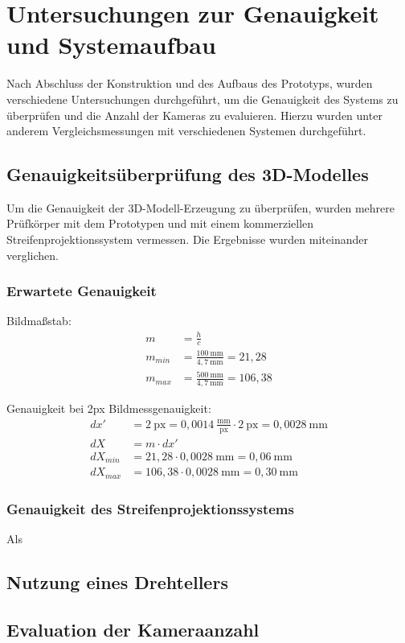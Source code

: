 \documentclass[./00PhotoBox.tex]{subfiles}
\begin{document}
\chapter{Untersuchungen zur Genauigkeit und Systemaufbau}
Nach Abschluss der Konstruktion und des Aufbaus des Prototyps, wurden verschiedene Untersuchungen durchgeführt, um die Genauigkeit des Systems zu überprüfen und die Anzahl der Kameras zu evaluieren. Hierzu wurden unter anderem Vergleichsmessungen mit verschiedenen Systemen durchgeführt.

\section{Genauigkeitsüberprüfung des 3D-Modelles}
Um die Genauigkeit der 3D-Modell-Erzeugung zu überprüfen, wurden mehrere Prüfkörper mit dem Prototypen und mit einem kommerziellen Streifenprojektionssystem vermessen. Die Ergebnisse wurden miteinander verglichen.

\subsection{Erwartete Genauigkeit}

Bildmaßstab:
\begin{align}
    m       & = \frac{h}{c}                                  \\
    m_{min} & = \frac{100~\text{mm}}{4,7~\text{mm}} = 21,28  \\
    m_{max} & = \frac{500~\text{mm}}{4,7~\text{mm}} = 106,38
\end{align}

Genauigkeit bei 2px Bildmessgenauigkeit:
\begin{align}
    dx'      & = 2~\text{px} = 0,0014~\frac{\text{mm}}{\text{px}} \cdot 2~\text{px} = 0,0028~\text{mm} \\
    dX       & = m \cdot dx'                                                                           \\
    dX_{min} & = 21,28 \cdot 0,0028~\text{mm} = 0,06~\text{mm}                                         \\
    dX_{max} & = 106,38 \cdot 0,0028~\text{mm} = 0,30~\text{mm}
\end{align}


\subsection{Genauigkeit des Streifenprojektionssystems}
Als


\section{Nutzung eines Drehtellers}


\section{Evaluation der Kameraanzahl}

\biblio
\end{document}
